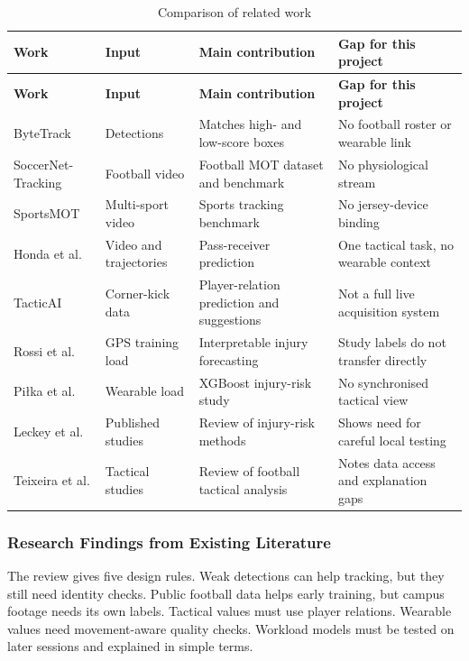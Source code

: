 \begin{longtable}{@{}p{0.95in}p{1.2in}p{1.65in}p{1.75in}@{}}
\caption{Comparison of related work}\label{tab:literature_comparison}\\
\toprule
\textbf{Work} & \textbf{Input} & \textbf{Main contribution} & \textbf{Gap for this project}\\
\midrule
\endfirsthead
\toprule
\textbf{Work} & \textbf{Input} & \textbf{Main contribution} & \textbf{Gap for this project}\\
\midrule
\endhead
ByteTrack \cite{zhang2022bytetrack} & Detections & Matches high- and low-score boxes & No football roster or wearable link\\
SoccerNet-Tracking \cite{cioppa2022soccernet} & Football video & Football MOT dataset and benchmark & No physiological stream\\
SportsMOT \cite{cui2023sportsmot} & Multi-sport video & Sports tracking benchmark & No jersey-device binding\\
Honda et al. \cite{honda2022pass} & Video and trajectories & Pass-receiver prediction & One tactical task, no wearable context\\
TacticAI \cite{tacticai2024} & Corner-kick data & Player-relation prediction and suggestions & Not a full live acquisition system\\
Rossi et al. \cite{rossi2018injury} & GPS training load & Interpretable injury forecasting & Study labels do not transfer directly\\
Pi{\l}ka et al. \cite{pilka2023workload} & Wearable load & XGBoost injury-risk study & No synchronised tactical view\\
Leckey et al. \cite{leckey2025injury} & Published studies & Review of injury-risk methods & Shows need for careful local testing\\
Teixeira et al. \cite{teixeira2025tactical} & Tactical studies & Review of football tactical analysis & Notes data access and explanation gaps\\
\bottomrule
\end{longtable}

\subsubsection{Research Findings from Existing Literature}
The review gives five design rules. Weak detections can help tracking, but they
still need identity checks. Public football data helps early training, but
campus footage needs its own labels. Tactical values must use player relations.
Wearable values need movement-aware quality checks. Workload models must be
tested on later sessions and explained in simple terms.

